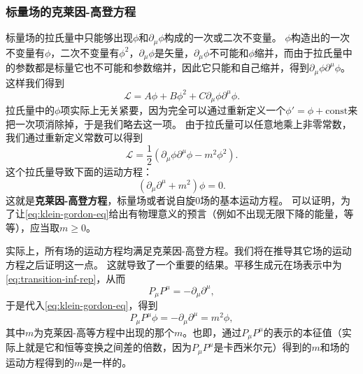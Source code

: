 \documentclass[hyperref, UTF8, a4paper]{ctexart}
\newcommand*{\const}{\mathrm{const}}
\renewcommand{\autoref}{\prettyref}
\begin{document}
\subsubsection{标量场的克莱因-高登方程}\label{sec:k-g-eq}

标量场的拉氏量中只能够出现$\phi$和$\partial_\mu \phi$构成的一次或二次不变量。
$\phi$构造出的一次不变量有$\phi$，二次不变量有$\phi^2$，$\partial_\mu \phi$是矢量，$\partial_\mu \phi$不可能和$\phi$缩并，而由于拉氏量中的参数都是标量它也不可能和参数缩并，因此它只能和自己缩并，得到$\partial_\mu \phi \partial^\mu \phi$。
这样我们得到
\[
    \mathcal{L} = A \phi + B \phi^2 + C \partial_\mu \phi \partial^\mu \phi.
\]
拉氏量中的$\phi$项实际上无关紧要，因为完全可以通过重新定义一个$\phi' = \phi + \const$来把一次项消除掉，于是我们略去这一项。
由于拉氏量可以任意地乘上非零常数，我们通过重新定义常数可以得到
\begin{equation}
    \mathcal{L} = \frac{1}{2} (\partial_\mu \phi \partial^\mu \phi - m^2 \phi^2).
    \label{eq:klein-gordon-lagrangian}
\end{equation}
这个拉氏量导致下面的运动方程：
\begin{equation}
    (\partial_\mu \partial^\mu + m^2) \phi = 0.
    \label{eq:klein-gordon-eq}
\end{equation}
这就是\textbf{克莱因-高登方程}，标量场或者说自旋0场的基本运动方程。
可以证明，为了让\eqref{eq:klein-gordon-eq}给出有物理意义的预言（例如不出现无限下降的能量，等等），应当取$m \geq 0$。

实际上，所有场的运动方程均满足克莱因-高登方程。我们将在推导其它场的运动方程之后证明这一点。
这就导致了一个重要的结果。平移生成元在场表示中为\eqref{eq:transition-inf-rep}，从而
\[
    P_\mu P^\mu = - \partial_\mu \partial^\mu,
\]
于是代入\eqref{eq:klein-gordon-eq}，得到
\[
    P_\mu P^\mu \phi = - \partial_\mu \partial^\mu = m^2 \phi,
\]
其中$m$为克莱因-高等方程中出现的那个$m$。也即，通过$P_\mu P^\mu$的表示的本征值（实际上就是它和恒等变换之间差的倍数，因为$P_\mu P^\mu$是卡西米尔元）得到的$m$和场的运动方程得到的$m$是一样的。
\end{document}
